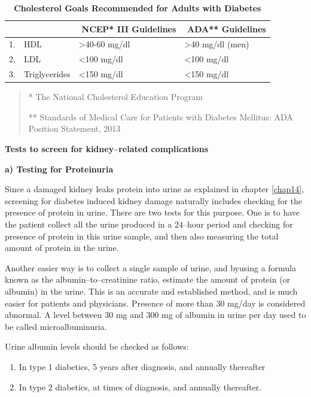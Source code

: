 {
\begin{table}[H]
\centering
\caption*{\textbf{Cholesterol Goals Recommended for Adults with Diabetes}}
\small\addtolength{\tabcolsep}{-3pt}
\begin{tabular}{|c|l|l|l|}
\hline
 & & \,\,\textbf{NCEP* III Guidelines} & \,\,\textbf{ADA** Guidelines}\\
\hline
1. & HDL & \textgreater 40-60 mg/dl & \textgreater 40 mg/dl (men)\\
\hline
2. & LDL & \textless 100 mg/dl & \textless 100 mg/dl\\
\hline
3. & Triglycerides & \textless 150 mg/dl & \textless 150 mg/dl\\
\hline
\end{tabular}
\end{table}
\begin{quote}
* The National Cholesterol Education Program

** Standards of Medical Care for Patients with Diabetes Mellitus: ADA
Position Statement, 2013
\end{quote}
}\relax

\noindent\textbf{Tests to screen for kidney–related complications}

\textbf{a) Testing for Proteinuria}

Since a damaged kidney leaks protein into urine as explained in chapter \ref{chap14}, screening for diabetes induced kidney damage naturally includes checking for the presence of protein in urine. There are two tests for this purpose. One is to have the patient collect all the urine produced in a 24–hour period and checking for presence of protein in this urine sample, and then also measuring the total amount of protein in the urine.

Another easier way is to collect a single sample of urine, and by\break using a formula known as the albumin–to–creatinine ratio, estimate the amount of protein (or albumin) in the urine. This is an accurate and established method, and is much easier for patients and physicians. Presence of more than 30 mg/day is considered abnormal. A level between 30 mg and 300 mg of albumin in urine per day used to be called microalbuminuria.

\noindent Urine albumin levels should be checked as follows:
\begin{enumerate}[•]
\itemsep=0pt
\item In type 1 diabetics, 5 years after diagnosis, and annually thereafter
\item In type 2 diabetics, at times of diagnosis, and annually thereafter.
\end{enumerate}

